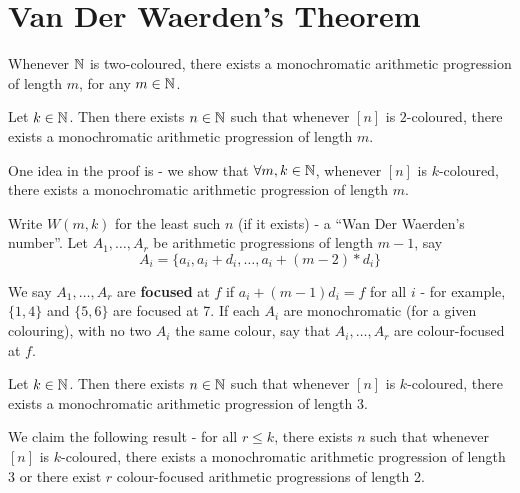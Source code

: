 
\chapter{Van Der Waerden's Theorem}
\label{cha:van-der-waerdens}

\begin{thm}
  \label{defn:van_der_waerdens_theorem:1}
  Whenever $\mathbb{N}$ is two-coloured, there exists a monochromatic
  arithmetic progression of length $m$, for any $m \in \mathbb{N}$.
\end{thm}

\begin{thm}
  \label{defn:van_der_waerdens_theorem:2}
  Let $k \in \mathbb{N}$. Then there exists $n \in \mathbb{N}$ such that whenever
  $[n]$ is $2$-coloured, there exists a monochromatic arithmetic
  progression of length $m$.
\end{thm}

One idea in the proof is - we show that $\forall m, k \in \mathbb{N}$,
whenever $[n]$ is $k$-coloured, there exists a monochromatic
arithmetic progression of length $m$.

Write $W(m, k)$ for the least such $n$ (if it exists) - a ``Wan Der
Waerden's number''.  Let $A_{1}, \dots, A_{r}$ be arithmetic
progressions of length $m-1$, say
\begin{equation}
  \label{eq:1}
  A_{i}= \{ a_{i}, a_{i} + d_{i}, \dots, a_{i}+ (m-2) * d_{i} \}
\end{equation}

We say $A_{1}, \dots, A_{r}$ are \textbf{focused} at $f$ if $a_{i} +
(m-1) d_{i} = f$ for all $i$ - for example, $\{ 1, 4\}$ and $\{ 5, 6
\}$ are focused at 7.  If each $A_{i}$ are monochromatic (for a given
colouring), with no two $A_{i}$ the same colour, say that $A_{i},
\dots, A_{r}$ are colour-focused at $f$.

\begin{proposition}
  Let $k \in \mathbb{N}$.  Then there exists $n \in \mathbb{N}$ such that whenever
  $[n]$ is $k$-coloured, there exists a monochromatic arithmetic
  progression of length 3.
\end{proposition}

\begin{lem}
  We claim the following result - for all $r \leq k$, there exists $n$
  such that whenever $[n]$ is $k$-coloured, there exists a
  monochromatic arithmetic progression of length 3 or there exist $r$
  colour-focused arithmetic progressions of length 2.
\end{lem}

